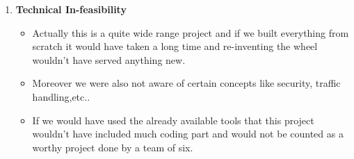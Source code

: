 \documentclass[fleqn,10pt]{../SelfArx} %
\begin{document}
\begin{enumerate}
\item \textbf{Technical In-feasibility}
\begin{itemize}
 \item Actually this is a quite wide range project and if we built everything from scratch it would have taken a long time and re-inventing the wheel wouldn't have served anything new.
 \item Moreover we were also not aware of certain concepts like security,  traffic handling,etc..
 \item If we would have used the already available tools that this project wouldn't have included much coding part and would not be counted as a worthy project done by a team of six.
\end{itemize}

\end{enumerate}
\end{document}
